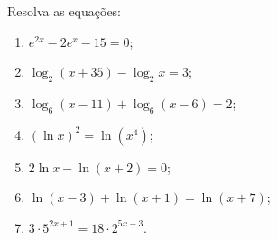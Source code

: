 Resolva as equações:
\begin{enumerate}
	\item $e^{2x}-2e^x-15=0$;
	\item $\log_2(x+35)-\log_2x=3$;
	\item $\log_6(x-11)+\log_6(x-6)=2$;
	\item $(\ln x)^2=\ln(x^4)$;
	\item $2\ln x-\ln(x+2)=0$;
	\item $\ln(x-3)+\ln(x+1)=\ln(x+7)$;
	\item $3\cdot 5^{2x+1}=18\cdot2^{5x-3}$.
\end{enumerate}
